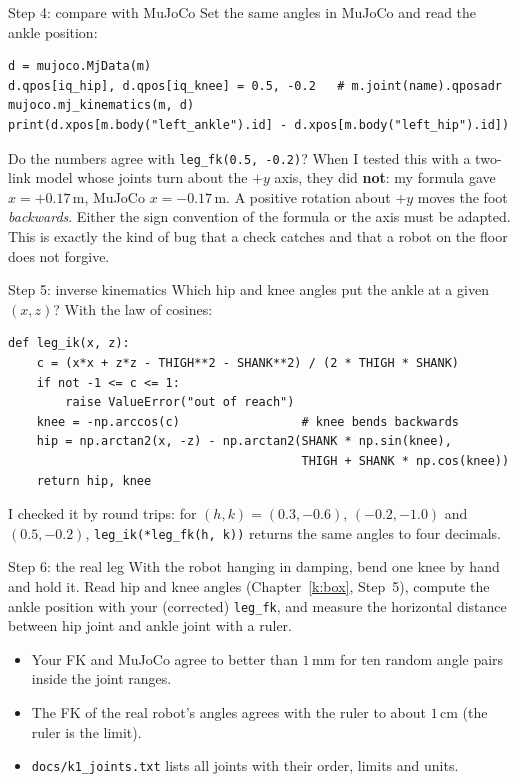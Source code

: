 \begin{stepbox}{Step 4: compare with MuJoCo}
Set the same angles in MuJoCo and read the ankle position:
\begin{verbatim}
d = mujoco.MjData(m)
d.qpos[iq_hip], d.qpos[iq_knee] = 0.5, -0.2   # m.joint(name).qposadr
mujoco.mj_kinematics(m, d)
print(d.xpos[m.body("left_ankle").id] - d.xpos[m.body("left_hip").id])
\end{verbatim}
Do the numbers agree with \verb!leg_fk(0.5, -0.2)!? When I tested this with a two-link model whose joints turn about the $+y$ axis, they did \textbf{not}: my formula gave $x=+0.17$\,m, MuJoCo $x=-0.17$\,m. A positive rotation about $+y$ moves the foot \emph{backwards}. Either the sign convention of the formula or the axis must be adapted. This is exactly the kind of bug that a check catches and that a robot on the floor does not forgive.
\end{stepbox}

\begin{stepbox}{Step 5: inverse kinematics}
Which hip and knee angles put the ankle at a given $(x,z)$? With the law of cosines:
\begin{verbatim}
def leg_ik(x, z):
    c = (x*x + z*z - THIGH**2 - SHANK**2) / (2 * THIGH * SHANK)
    if not -1 <= c <= 1:
        raise ValueError("out of reach")
    knee = -np.arccos(c)                 # knee bends backwards
    hip = np.arctan2(x, -z) - np.arctan2(SHANK * np.sin(knee),
                                         THIGH + SHANK * np.cos(knee))
    return hip, knee
\end{verbatim}
I checked it by round trips: for $(h,k)=(0.3,-0.6)$, $(-0.2,-1.0)$ and $(0.5,-0.2)$, \verb!leg_ik(*leg_fk(h, k))! returns the same angles to four decimals.
\end{stepbox}

\begin{stepbox}{Step 6: the real leg}
With the robot hanging in damping, bend one knee by hand and hold it. Read hip and knee angles (Chapter~\ref{k:box}, Step~5), compute the ankle position with your (corrected) \verb!leg_fk!, and measure the horizontal distance between hip joint and ankle joint with a ruler.
\end{stepbox}

\begin{checkbox}
\begin{itemize}[nosep]
  \item Your FK and MuJoCo agree to better than $1$\,mm for ten random angle pairs inside the joint ranges.
  \item The FK of the real robot's angles agrees with the ruler to about $1$\,cm (the ruler is the limit).
  \item \texttt{docs/k1\_joints.txt} lists all joints with their order, limits and units.
\end{itemize}
\end{checkbox}

